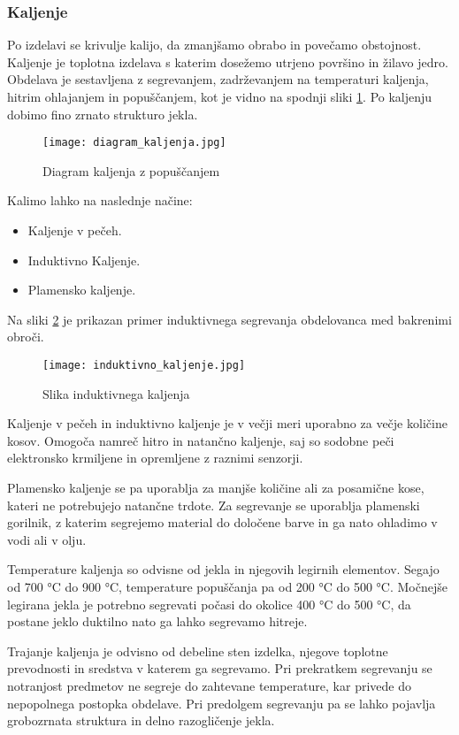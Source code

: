 \subsubsection{Kaljenje}
Po izdelavi se krivulje kalijo, da zmanjšamo obrabo in povečamo
obstojnost. Kaljenje je toplotna izdelava s katerim dosežemo utrjeno površino in
žilavo jedro. Obdelava je sestavljena z segrevanjem, zadrževanjem na temperaturi
kaljenja, hitrim ohlajanjem in popuščanjem, kot je vidno na spodnji
sliki \ref{diagram_kaljenja}. Po kaljenju dobimo fino zrnato strukturo jekla.

\begin{figure}[H]
	\begin{center}
		\texttt{[image: diagram\_kaljenja.jpg]}
		\caption{Diagram kaljenja z popuščanjem
			\cite{diagram_kaljenja}}
		\label{diagram_kaljenja}
	\end{center}
\end{figure}

Kalimo lahko na naslednje načine:
\begin{itemize}
	\item Kaljenje v pečeh.
	\item Induktivno Kaljenje.
	\item Plamensko kaljenje.
\end{itemize}

Na sliki \ref{induktivno_kaljenje} je prikazan primer induktivnega
segrevanja obdelovanca med bakrenimi obroči.

\begin{figure}[H]
	\begin{center}
		\texttt{[image: induktivno\_kaljenje.jpg]}
		\caption{Slika induktivnega kaljenja
			\cite{induktivno_kaljenje}}
		\label{induktivno_kaljenje}
	\end{center}
\end{figure}

Kaljenje v pečeh in induktivno kaljenje je v večji meri uporabno
za večje količine kosov. Omogoča namreč hitro in natančno kaljenje,
saj so sodobne peči elektronsko krmiljene in opremljene z raznimi senzorji.

Plamensko kaljenje se pa uporablja za manjše količine ali za
posamične kose, kateri ne potrebujejo natančne trdote. Za
segrevanje se uporablja plamenski gorilnik, z katerim segrejemo
material do določene barve in ga nato ohladimo v vodi ali v olju.

Temperature kaljenja so odvisne od jekla in njegovih legirnih
elementov. Segajo od 700 °C do 900 °C, temperature popuščanja
pa od 200 °C do 500 °C. Močnejše legirana jekla je potrebno
segrevati počasi do okolice 400 °C do 500 °C, da postane jeklo
duktilno nato ga lahko segrevamo hitreje.

Trajanje kaljenja je odvisno od debeline sten izdelka, njegove toplotne
prevodnosti in sredstva v katerem ga segrevamo. Pri prekratkem
segrevanju se notranjost predmetov ne segreje do zahtevane
temperature, kar privede do nepopolnega postopka obdelave. Pri
predolgem segrevanju pa se lahko pojavlja grobozrnata struktura
in delno razogličenje jekla.